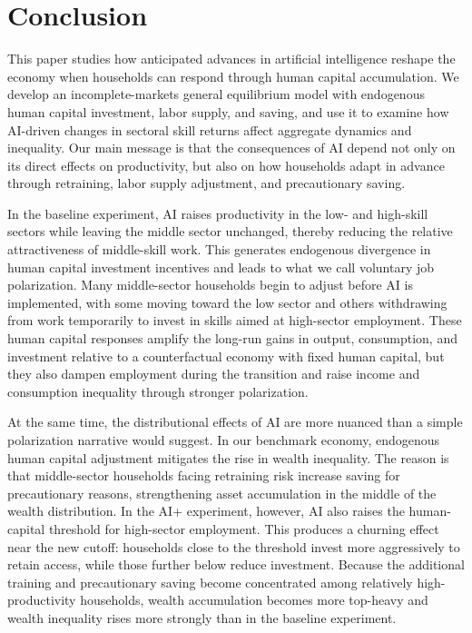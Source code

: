 \documentclass[12pt,english]{article}
\numberwithin{equation}{section}
\begin{document}
\section{Conclusion}

This paper studies how anticipated advances in artificial intelligence reshape the economy when households can respond through human capital accumulation. We develop an incomplete-markets general equilibrium model with endogenous human capital investment, labor supply, and saving, and use it to examine how AI-driven changes in sectoral skill returns affect aggregate dynamics and inequality. Our main message is that the consequences of AI depend not only on its direct effects on productivity, but also on how households adapt in advance through retraining, labor supply adjustment, and precautionary saving.

In the baseline experiment, AI raises productivity in the low- and high-skill sectors while leaving the middle sector unchanged, thereby reducing the relative attractiveness of middle-skill work. This generates endogenous divergence in human capital investment incentives and leads to what we call voluntary job polarization. Many middle-sector households begin to adjust before AI is implemented, with some moving toward the low sector and others withdrawing from work temporarily to invest in skills aimed at high-sector employment. These human capital responses amplify the long-run gains in output, consumption, and investment relative to a counterfactual economy with fixed human capital, but they also dampen employment during the transition and raise income and consumption inequality through stronger polarization.

At the same time, the distributional effects of AI are more nuanced than a simple polarization narrative would suggest. In our benchmark economy, endogenous human capital adjustment mitigates the rise in wealth inequality. The reason is that middle-sector households facing retraining risk increase saving for precautionary reasons, strengthening asset accumulation in the middle of the wealth distribution. In the AI+ experiment, however, AI also raises the human-capital threshold for high-sector employment. This produces a churning effect near the new cutoff: households close to the threshold invest more aggressively to retain access, while those further below reduce investment. Because the additional training and precautionary saving become concentrated among relatively high-productivity households, wealth accumulation becomes more top-heavy and wealth inequality rises more strongly than in the baseline experiment.
\end{document}

